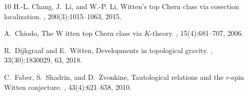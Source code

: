 \documentclass[11pt]{amsart}
\theoremstyle{definition}
\theoremstyle{remark}
\newcommand{\<}{\left<}
\renewcommand{\>}{\right>}
\numberwithin{equation}{section}
\begin{document}
\begin{thebibliography}{10}
H.-L. Chang, J.~Li, and %
W.-P. Li,
\newblock Witten's top %
{C}hern class via cosection localization.
, 200(3):1015--1063, 2015.

A.~Chiodo,
\newblock The {W%
}itten top {C}hern class via {$K$}-theory.
, 15(4):681--707, 2006.

R.~Dijkgraaf and %
E.~Witten,
\newblock Developments in %
topological gravity.
, 33(30):1830029, 63, 2018.

C.~Faber, S.~Shadrin, and %
D.~Zvonkine,
\newblock Tautological relations %
and the {$r$}-spin {W}itten conjecture.
, 43(4):621--658, 2010.


\end{thebibliography}
\end{document}
